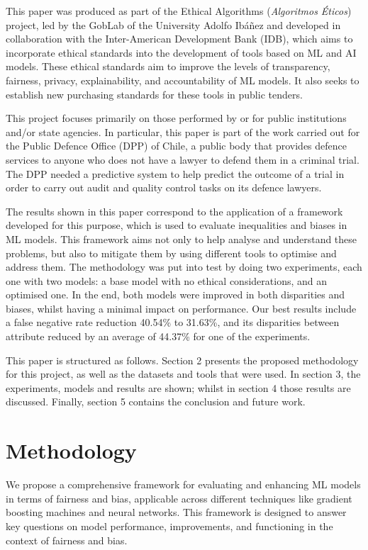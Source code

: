 \documentclass[twoside,11pt]{article}
\begin{document}
This paper was produced as part of the Ethical Algorithms (\textit{Algoritmos Éticos}) project, led by the GobLab of the University Adolfo Ibáñez and developed in collaboration with the Inter-American Development Bank (IDB), which aims to incorporate ethical standards into the development of tools based on ML and AI models. These ethical standards aim to improve the levels of transparency, fairness, privacy, explainability, and accountability of ML models. It also seeks to establish new purchasing standards for these tools in public tenders.

This project focuses primarily on those performed by or for public institutions and/or state agencies. In particular, this paper is part of the work carried out for the Public Defence Office (DPP) of Chile, a public body that provides defence services to anyone who does not have a lawyer to defend them in a criminal trial. The DPP needed a predictive system to help predict the outcome of a trial in order to carry out audit and quality control tasks on its defence lawyers.

The results shown in this paper correspond to the application of a framework developed for this purpose, which is used to evaluate inequalities and biases in ML models. This framework aims not only to help analyse and understand these problems, but also to mitigate them by using different tools to optimise and address them. The methodology was put into test by doing two experiments, each one with two models: a base model with no ethical considerations, and an optimised one. In the end, both models were improved in both disparities and biases, whilst having a minimal impact on performance. Our best results include a false negative rate reduction 40.54\% to 31.63\%, and its disparities between attribute reduced by an average of 44.37\% for one of the experiments.

This paper is structured as follows. Section 2 presents the proposed methodology for this project, as well as the datasets and tools that were used. In section 3, the experiments, models and results are shown; whilst in section 4 those results are discussed. Finally, section 5 contains the conclusion and future work.


\section{Methodology}
\label{methods}

We propose a comprehensive framework for evaluating and enhancing ML models in terms of fairness and bias, applicable across different techniques like gradient boosting machines and neural networks. This framework is designed to answer key questions on model performance, improvements, and functioning in the context of fairness and bias.
\end{document}
